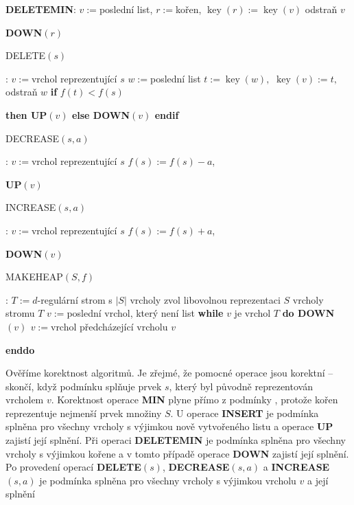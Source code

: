 \documentclass[a4paper,12pt]{article}
\DeclareMathOperator*{\key}{key}
\begin{document}
{\bf DELETEMIN}:\newline 
$v:=$poslední list, $r:=$kořen, $\key(r):=\key(v)$\newline 
odstraň $v$\newline 
{\bf DOWN$(r)$

DELETE$(s)$}:\newline 
$v:=$vrchol reprezentující $s$\newline 
$w:=$poslední list\newline 
$t:=\key(w),$ $\key(v):=t,$ odstraň $w$\newline 
{\bf if} $f(t)<f(s)$ {\bf then UP$(v)$ else DOWN$(v)$ endif

DECREASE$(s,a)$}:\newline 
$v:=$vrchol reprezentující $s$\newline 
$f(s):=f(s)-a$, {\bf UP$(v)$

INCREASE$(s,a)$}:\newline 
$v:=$vrchol reprezentující $s$\newline 
$f(s):=f(s)+a$, {\bf DOWN$(v)$

MAKEHEAP$(S,f)$}:\newline 
$T:=d$-regulární strom s $|S|$ vrcholy\newline 
zvol libovolnou reprezentaci $S$ vrcholy stromu $T$\newline 
$v:=$poslední vrchol, který není list\newline 
{\bf while} $v$ je vrchol $T$ {\bf do\newline 
\phantom{{\rm ---}}DOWN$(v)$\newline 
\phantom{{\rm ---}}$v:=$}vrchol předcházející 
vrcholu $v$\newline 
{\bf enddo

}
Ověříme korektnost algoritmů.  Je zřejmé, že 
pomocné operace jsou korektní -- skončí, když podmínku 
 splňuje prvek $s$, který byl původně 
reprezentován vrcholem $v$. Korektnost operace {\bf MIN} plyne 
přímo z podmínky , protože kořen reprezentuje nejmenší 
prvek množiny $S$. U operace {\bf INSERT} je podmínka 
 splněna pro všechny vrcholy s výjimkou nově 
vytvořeného listu a operace {\bf UP} zajistí její splnění.  Při 
operaci {\bf DELETEMIN} je pod\-mín\-ka  splněna pro 
všechny vrcholy s výjimkou kořene a v tomto případě ope\-race {\bf DOWN} zajistí 
její splnění.  Po provedení operací {\bf DE\-LE\-TE$
(s)$}, {\bf DECREASE$(s,a)$ }
a {\bf INCREASE$(s,a)$} je pod\-mín\-ka  splněna pro 
všechny vrcholy s výjimkou vrcholu $v$ a její splnění 
\end{document}
